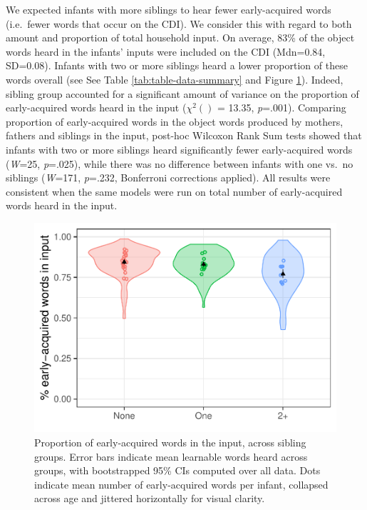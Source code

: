 \documentclass[
  english,
  man,floatsintext]{apa6}
\begin{document}
We expected infants with more siblings to hear fewer early-acquired words (i.e.~fewer words that occur on the CDI). We consider this with regard to both amount and proportion of total household input. On average, 83\% of the object words heard in the infants' inputs were included on the CDI (Mdn=0.84, SD=0.08). Infants with two or more siblings heard a lower proportion of these words overall (see See Table \ref{tab:table-data-summary} and Figure \ref{fig:Figure-in-cdi}). Indeed, sibling group accounted for a significant amount of variance on the proportion of early-acquired words heard in the input (\(\chi^2 ()\) = 13.35, \emph{p}=.001). Comparing proportion of early-acquired words in the object words produced by mothers, fathers and siblings in the input, post-hoc Wilcoxon Rank Sum tests showed that infants with two or more siblings heard significantly fewer early-acquired words (\emph{W}=25, \emph{p}=.025), while there was no difference between infants with one vs.~no siblings (\emph{W}=171, \emph{p}=.232, Bonferroni corrections applied). All results were consistent when the same models were run on total number of early-acquired words heard in the input.

\begin{figure}
\centering
\includegraphics{SiblingsStudyText_files/figure-latex/Figure-in-cdi-1.pdf}
\caption{\label{fig:Figure-in-cdi}Proportion of early-acquired words in the input, across sibling groups. Error bars indicate mean learnable words heard across groups, with bootstrapped 95\% CIs computed over all data. Dots indicate mean number of early-acquired words per infant, collapsed across age and jittered horizontally for visual clarity.}
\end{figure}
\end{document}
